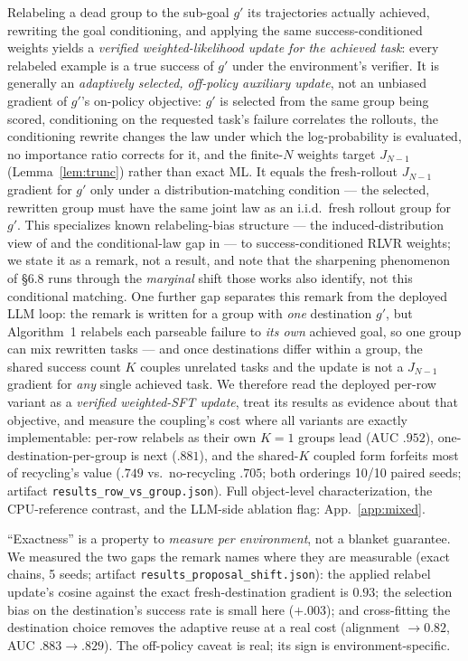 \begin{remark}\label{prop:hindsight}
Relabeling a dead group to the sub-goal $g'$ its trajectories actually
achieved, rewriting the goal conditioning, and applying the same
success-conditioned weights yields a \emph{verified weighted-likelihood
update for the achieved task}: every relabeled example is a true
success of $g'$ under the environment's verifier. It is generally an
\emph{adaptively selected, off-policy auxiliary update}, not an
unbiased gradient of $g'$'s on-policy objective: $g'$ is selected from
the same group being scored, conditioning on the requested task's
failure correlates the rollouts, the conditioning rewrite changes the
law under which the log-probability is evaluated, no importance ratio
corrects for it, and the finite-$N$ weights target $J_{N-1}$
(Lemma~\ref{lem:trunc}) rather than exact ML. It equals the
fresh-rollout $J_{N-1}$ gradient for $g'$ only under a
distribution-matching condition --- the selected, rewritten group must
have the same joint law as an i.i.d.\ fresh rollout group for $g'$.
This specializes known relabeling-bias structure --- the
induced-distribution view of \citet{eysenbach} and the
conditional-law gap in \citet{gcsl} --- to success-conditioned RLVR
weights; we state it as a remark, not a result, and note that the
sharpening phenomenon of \S 6.8 runs through the \emph{marginal}
shift those works also identify, not this conditional matching.
One further gap separates this remark from the deployed LLM loop:
the remark is written for a group with \emph{one} destination $g'$,
but Algorithm~1 relabels each parseable failure to \emph{its own}
achieved goal, so one group can mix rewritten tasks --- and once
destinations differ within a group, the shared success count $K$
couples unrelated tasks and the update is not a $J_{N-1}$ gradient
for \emph{any} single achieved task. We therefore read the deployed
per-row variant as a \emph{verified weighted-SFT update}, treat its
results as evidence about that objective, and measure the coupling's
cost where all variants are exactly implementable: per-row relabels
as their own $K{=}1$ groups lead (AUC $.952$),
one-destination-per-group is next ($.881$), and the shared-$K$
coupled form forfeits most of recycling's value ($.749$ vs.\
no-recycling $.705$; both orderings 10/10 paired seeds; artifact
\texttt{results\_row\_vs\_group.json}). Full object-level
characterization, the CPU-reference contrast, and the LLM-side
ablation flag: App.~\ref{app:mixed}.
\end{remark}
\begin{interp}
``Exactness'' is a property to \emph{measure per environment}, not a
blanket guarantee. We measured the two gaps the remark names where
they are measurable (exact chains, 5 seeds; artifact
\texttt{results\_proposal\_shift.json}): the applied relabel update's
cosine against the exact fresh-destination gradient is $0.93$; the
selection bias on the destination's success rate is small here
($+.003$); and cross-fitting the destination choice removes the
adaptive reuse at a real cost (alignment $\to 0.82$, AUC
$.883\to.829$). The off-policy caveat is real; its sign is
environment-specific.
\end{interp}

